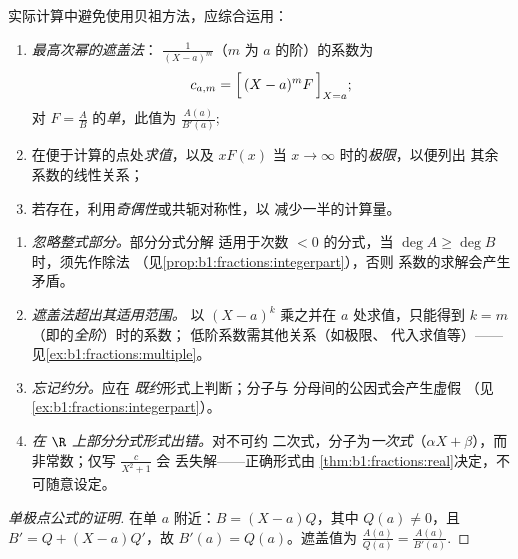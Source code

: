 \begin{method}[系数的计算]\label{met:b1:fractions:compute}
实际计算中避免使用贝祖方法，应综合运用：
\begin{enumerate}
  \item \emph{最高次幂的遮盖法}：
        $\frac{1}{(X-a)^m}$（$m$ 为 $a$ 的阶）的系数为
        \[
        c_{a,m} = \Bigl[\,(X - a)^m F\,\Bigr]_{X = a};
        \]
        对 $F = \frac AB$ 的\emph{单}，此值为
        $\frac{A(a)}{B'(a)}$;
  \item 在便于计算的点处\emph{求值}，以及
        $xF(x)$ 当 $x \to \infty$ 时的\emph{极限}，以便列出
        其余系数的线性关系；
  \item 若存在，利用\emph{奇偶性}或共轭对称性，以
        减少一半的计算量。
\end{enumerate}
\end{method}

\begin{remark}[部分分式的常见易错点]\label{rem:b1:fractions:pitfalls}
\begin{enumerate}
  \item \emph{忽略整式部分。}部分分式分解
        适用于次数 $< 0$ 的分式，当 $\deg A \geq
        \deg B$ 时，须先作除法
        （见\cref{prop:b1:fractions:integerpart}），否则
        系数的求解会产生矛盾。
  \item \emph{遮盖法超出其适用范围。}
        以 $(X - a)^k$ 乘之并在 $a$ 处求值，只能得到
        $k = m$（即的\emph{全阶}）时的系数；
        低阶系数需其他关系（如极限、
        代入求值等）——见\cref{ex:b1:fractions:multiple}。
  \item \emph{忘记约分。}应在
        \emph{既约}形式上判断；分子与
        分母间的公因式会产生虚假
        （见\cref{ex:b1:fractions:integerpart}）。
  \item \emph{在 $\R$ 上部分分式形式出错。}对不可约
        二次式，分子为\emph{一次式}（$\alpha X +
        \beta$），而非常数；仅写 $\frac{c}{X^2 + 1}$ 会
        丢失解——正确形式由
        \cref{thm:b1:fractions:real}决定，不可随意设定。
\end{enumerate}
\end{remark}

\begin{proof}[单极点公式的证明]
在单 $a$ 附近：$B = (X - a) Q$，其中 $Q(a) \neq 0$，且 $B' =
Q + (X - a) Q'$，故 $B'(a) = Q(a)$。遮盖值为
$\frac{A(a)}{Q(a)} = \frac{A(a)}{B'(a)}$.
\end{proof}

